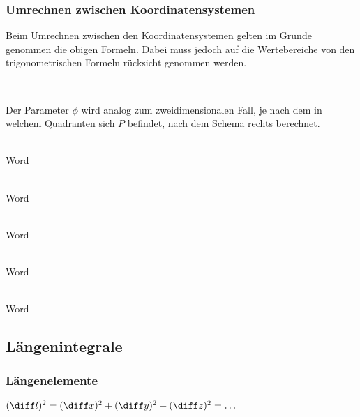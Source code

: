 \subsubsection{Umrechnen zwischen Koordinatensystemen}
Beim Umrechnen zwischen den Koordinatensystemen gelten im Grunde genommen die obigen Formeln. 
Dabei muss jedoch auf die Wertebereiche von den trigonometrischen Formeln rücksicht genommen werden.

\\
\begin{minipage}{0.49\linewidth}
    Der Parameter $\phi$ wird analog zum zweidimensionalen Fall, je nach dem in welchem Quadranten sich $P$ befindet, nach dem Schema rechts berechnet.
\end{minipage}
\hfill
\begin{minipage}{0.49\linewidth}
    \begin{center}
    \end{center}
\end{minipage}

\\
Word

\\
Word

\\
Word

\\
Word

\\
Word

\subsection{Längenintegrale}
\subsubsection{Längenelemente}
$ (\diff l)^2 = (\diff x)^2 + (\diff y)^2 + (\diff z)^2 = \dots $
